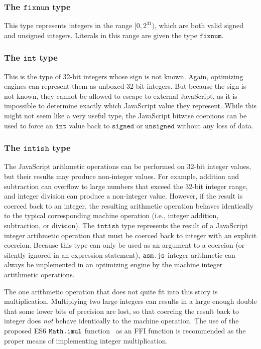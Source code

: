 \documentclass{article}
\newcommand{\mathjs}[1]{\mbox{\texttt{{#1}}}}
\newcommand{\unsigned}{\mathtt{unsigned}}
\newcommand{\signed}{\mathtt{signed}}
\newcommand{\fixnum}{\mathtt{fixnum}}
\renewcommand{\int}{\mathtt{int}}
\newcommand{\intish}{\mathtt{intish}}
\begin{document}
\subsubsection*{The $\fixnum$ type}

This type represents integers in the range $[0, 2^{31})$, which are
both valid signed and unsigned integers. Literals in this range are
given the type $\fixnum$.

\subsubsection*{The $\int$ type}

This is the type of 32-bit integers whose sign is not known. Again,
optimizing engines can represent them as unboxed 32-bit integers. But
because the sign is not known, they cannot be allowed to escape to
external JavaScript, as it is impossible to determine exactly which
JavaScript value they represent. While this might not seem like a very
useful type, the JavaScript bitwise coercions can be used to force an
$\int$ value back to $\signed$ or $\unsigned$ without any loss of
data.

\subsubsection*{The $\intish$ type}

The JavaScript arithmetic operations can be performed on 32-bit
integer values, but their results may produce non-integer values. For
example, addition and subtraction can overflow to large numbers that
exceed the 32-bit integer range, and integer division can produce a
non-integer value. However, if the result is coerced back to an
integer, the resulting arithmetic operation behaves identically to the
typical corresponding machine operation (i.e., integer addition,
subtraction, or division). The $\intish$ type represents the result of
a JavaScript integer artihmetic operation that must be coerced back to
integer with an explicit coercion. Because this type can only be used
as an argument to a coercion (or silently ignored in an expression
statement), $\mathjs{asm.js}$ integer arithmetic can always be
implemented in an optimizing engine by the machine integer artithmetic
operations.

The one arithmetic operation that does not quite fit into this story
is multiplication. Multiplying two large integers can results in a
large enough double that some lower bits of precision are lost, so
that coercing the result back to integer does {\it not} behave
identically to the machine operation. The use of the proposed ES6
$\mathjs{Math.imul}$ function~\cite{imul} as an FFI function is
recommended as the proper means of implementing integer
multiplication.
\end{document}

